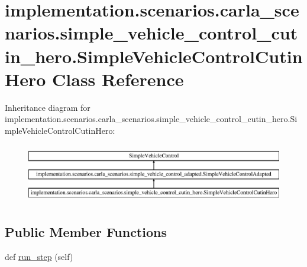 \hypertarget{classimplementation_1_1scenarios_1_1carla__scenarios_1_1simple__vehicle__control__cutin__hero_1_11e90bc75d1539d6c07dc5179559d6d0}{}\section{implementation.\+scenarios.\+carla\+\_\+scenarios.\+simple\+\_\+vehicle\+\_\+control\+\_\+cutin\+\_\+hero.\+Simple\+Vehicle\+Control\+Cutin\+Hero Class Reference}
\label{classimplementation_1_1scenarios_1_1carla__scenarios_1_1simple__vehicle__control__cutin__hero_1_11e90bc75d1539d6c07dc5179559d6d0}
Inheritance diagram for implementation.\+scenarios.\+carla\+\_\+scenarios.\+simple\+\_\+vehicle\+\_\+control\+\_\+cutin\+\_\+hero.\+Simple\+Vehicle\+Control\+Cutin\+Hero\+:\begin{figure}[H]
\begin{center}
\leavevmode
\includegraphics[height=2.633229cm]{classimplementation_1_1scenarios_1_1carla__scenarios_1_1simple__vehicle__control__cutin__hero_1_11e90bc75d1539d6c07dc5179559d6d0}
\end{center}
\end{figure}
\subsection*{Public Member Functions}
\begin{DoxyCompactItemize}
\item 
def \hyperlink{classimplementation_1_1scenarios_1_1carla__scenarios_1_1simple__vehicle__control__cutin__hero_1_11e90bc75d1539d6c07dc5179559d6d0_a770942881c3cd7ebb8a54e5b82eb4b5d}{run\+\_\+step} (self)
\end{DoxyCompactItemize}


